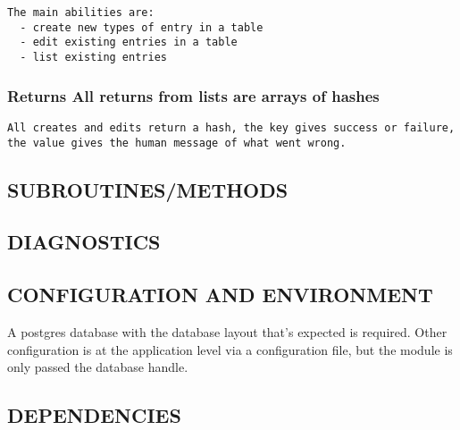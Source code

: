 \documentclass{book}
\begin{document}
\begin{Verbatim}[fontfamily=courier,gobble=1,frame=lines,fontsize=\small]
 The main abilities are:
  - create new types of entry in a table
  - edit existing entries in a table
  - list existing entries
\end{Verbatim}


\subsubsection{Returns All returns from lists are arrays of hashes}
\label{Inventory_Returns_All_returns_from_lists_are_arrays_of_hashes}
\hypertarget{Inventory_Returns_All_returns_from_lists_are_arrays_of_hashes}{}


\begin{lstlisting}[frame=lines,gobble=1]
 All creates and edits return a hash, the key gives success or failure, the value gives the human message of what went wrong.
\end{lstlisting}


\subsection{SUBROUTINES/METHODS}
\label{Inventory_SUBROUTINES_METHODS}
\hypertarget{Inventory_SUBROUTINES_METHODS}{}


\subsection{DIAGNOSTICS}
\label{Inventory_DIAGNOSTICS}
\hypertarget{Inventory_DIAGNOSTICS}{}


\subsection{CONFIGURATION AND ENVIRONMENT}
\label{Inventory_CONFIGURATION_AND_ENVIRONMENT}
\hypertarget{Inventory_CONFIGURATION_AND_ENVIRONMENT}{}



A postgres database with the database layout that's expected is required. Other configuration is at the application level via a configuration file, but the module is only passed the database handle.


\subsection{DEPENDENCIES}
\label{Inventory_DEPENDENCIES}
\hypertarget{Inventory_DEPENDENCIES}{}
\end{document}
